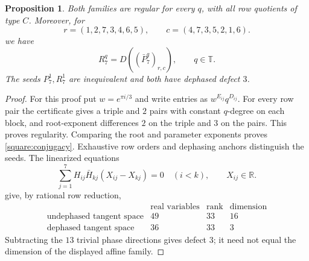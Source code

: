 \documentclass[11pt,a4paper]{article}
\newtheorem{proposition}[theorem]{Proposition}
\theoremstyle{plain}
\theoremstyle{definition}
\numberwithin{equation}{section}
\begin{document}
\begin{proposition}\label{square:valid}
Both families are regular for every $q$, with all row quotients of type $C$. Moreover, for
$$r=(1,2,7,3,4,6,5),\qquad c=(4,7,3,5,2,1,6).$$
we have
\begin{equation}\label{square:conjugacy}
 \boxed{\quad R_7^q=D\!\left(
           (\bar{P}_7^q)_{r,c}\right),\qquad q\in\mathbb{T}.\quad}
\end{equation}
The seeds $P_7^1,R_7^1$ are inequivalent and both have dephased defect $3$.
\end{proposition}
\begin{proof}
For this proof put $w=e^{\pi i/3}$ and write entries as $w^{E_{ij}}q^{D_{ij}}$. For every row pair the certificate gives a triple and $2$ pairs with constant $q$-degree on each block, and root-exponent differences $2$ on the triple and $3$ on the pairs. This proves regularity. Comparing the root and parameter exponents proves \eqref{square:conjugacy}. Exhaustive row orders and dephasing anchors distinguish the seeds. The linearized equations
$$
 \sum_{j=1}^7 H_{ij}\bar{H}_{kj}(X_{ij}-X_{kj})=0
 \quad(i<k),\qquad X_{ij}\in\mathbb{R}.
$$
give, by rational row reduction,
$$
\begin{array}{c|rrr}
 &\text{real variables}&\text{rank}&\text{dimension}\\\hline
\text{undephased tangent space}&49&33&16\\
\text{dephased tangent space}&36&33&3
\end{array}
$$
Subtracting the $13$ trivial phase directions gives defect $3$; it need not equal the dimension of the displayed affine family.
\end{proof}
\end{document}
